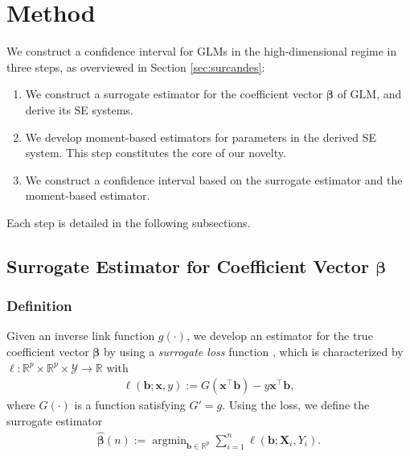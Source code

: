 \documentclass[12pt,reqno]{amsart}
\newcommand{\rbr}[1]{\left(#1\right)}
\newcommand{\R}{\mathbb{R}}
\DeclareMathOperator*{\argmin}{arg min}
\newcommand{\cc}{\color{black}}
\renewcommand{\hat}{\widehat}
\def\bb{\bm{b}}
\def\bx{\bm{x}}
\def\bX{\bm{X}}
\def\bbeta{\bm{\beta}}
\begin{document}
\section{Method}



We {\cc construct} a confidence interval for GLMs in the high-dimensional regime {\cc in} three steps, as overviewed in Section \ref{sec:surcandes}:
\begin{enumerate}
    \item We construct a surrogate estimator for the coefficient {\cc vector} $\bbeta$ of GLM, and derive its SE systems.
    \item We develop moment-based estimators for parameters in the derived SE system. This step constitutes the core of our novelty. 
    \item We construct a confidence interval based on the surrogate estimator and the moment-based estimator.
\end{enumerate}
Each step is detailed in the following subsections.

\subsection{Surrogate Estimator for Coefficient Vector \texorpdfstring{$\bbeta$}{beta}}
\label{sec:surrogate}

\subsubsection{Definition}

Given an inverse link function $g(\cdot)$, we develop an estimator for the true coefficient vector $\bbeta$ by using a \textit{surrogate loss} function  \citep{auer1995exponentially,agarwal2014least}, which is characterized by $\ell: \mathbb{R}^p \times \mathbb{R}^p \times \mathcal{Y}\to\R$ with
\begin{align}
\ell(\bb;\bx,y):=G\rbr{\bx^\top \bb}-y \bx^\top \bb, \label{def:surrogate_loss}
\end{align}
where $G(\cdot)$ is a function satisfying $G'=g$.
Using the loss, we define the surrogate estimator 
\begin{align}
\label{eq:estimator}
    \hat{\bbeta}(n):=\argmin_{\bb\in\R^p}\sum_{i=1}^n\ell(\bb;\bX_i,Y_i).
\end{align}
\end{document}

